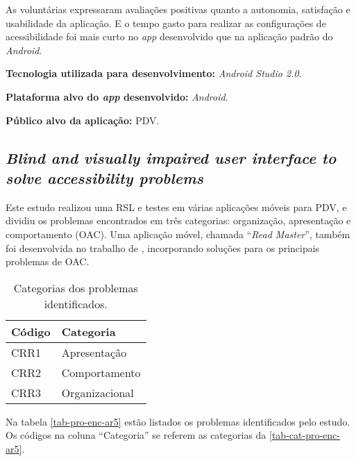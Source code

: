 As voluntárias expressaram avaliações positivas quanto a autonomia, satisfação e usabilidade da aplicação.
E o tempo gasto para realizar as configurações de acessibilidade foi mais curto no \emph{app} desenvolvido que na aplicação padrão do \emph{Android}.

\textbf{Tecnologia utilizada para desenvolvimento:} \emph{Android Studio 2.0}.

\textbf{Plataforma alvo do \emph{app} desenvolvido:} \emph{Android}.

\textbf{Público alvo da aplicação:} PDV\@.

\subsection{\emph{Blind and visually impaired user interface to solve accessibility problems}}

Este estudo realizou uma RSL e testes em várias aplicações móveis para PDV, e dividiu os problemas encontrados em três categorias: organização, apresentação e comportamento (OAC).
Uma aplicação móvel, chamada ``\emph{Read Master}'', também foi desenvolvida no trabalho de , incorporando soluções para os principais problemas de OAC\@.

\begin{table}[htb]
    \begin{center}
        \ABNTEXfontereduzida
        \caption{Categorias dos problemas identificados.}
        \label{tab-cat-pro-enc-ar5}
        \begin{tabular}{p{2.0cm}|p{5.0cm}}
            \textbf{Código} & \textbf{Categoria} \\
            \hline
            CRR1            & Apresentação       \\
            \hline
            CRR2            & Comportamento      \\
            \hline
            CRR3            & Organizacional     \\
        \end{tabular}
    \end{center}
\end{table}

Na tabela \autoref{tab-pro-enc-ar5} estão listados os problemas identificados pelo estudo.
Os códigos na coluna ``Categoria'' se referem as categorias da \autoref{tab-cat-pro-enc-ar5}.


